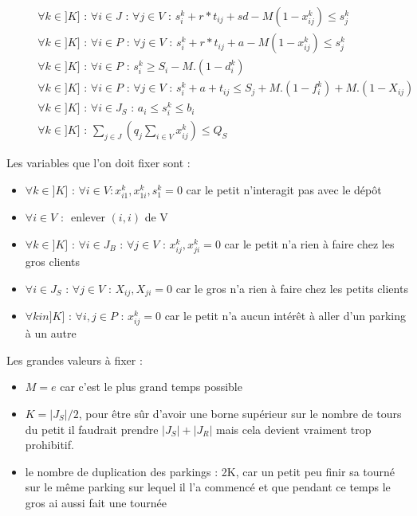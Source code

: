 \documentclass[12pt,a4paper,fleqn]{article}
\begin{document}
\begin{align}
& && \forall k \in ]K] \text{ : } \forall i \in J \text{ : } \forall j \in V \text{ : } s_i^k + r*t_{ij} + sd - M(1-x_{ij}^k) \leqslant s_j^k \label{sequentialitepetit1} \\
& && \forall k \in ]K] \text{ : } \forall i \in P \text{ : } \forall j \in V \text{ : } s_i^k + r*t_{ij} + a - M(1-x_{ij}^k) \leqslant s_j^k \label{sequentialitepetit2} \\
& && \forall k \in ]K] \text{ : } \forall i \in P \text{ : } s_i^k \geqslant S_i - M.(1 - d_i^k) \label{datedebutpetit} \\
& && \forall k \in ]K] \text{ : } \forall i \in P \text{ : } \forall j \in V \text{ : } s_i^k + a + t_{ij} \leqslant S_j + M.(1 - f^k_i) + M.(1 - X_{ij}) \label{datedefinpetit} \\
& && \forall k \in ]K] \text{ : } \forall i \in J_S \text{ : } a_i \leqslant s_i^k \leqslant b_i \label{fenetrepetit} \\
& && \forall k \in ]K] \text{ : } \sum \limits_{j \in J} (q_j \sum \limits_{i \in V} x^k_{ij}) \leqslant Q_S \label{capa}
\end{align}

\clearpage

Les variables que l'on doit fixer sont :
\begin{itemize}
\item $\forall k \in ]K] \text{ : } \forall i \in V : x^k_{i1}, x^k_{1i}, s^k_1 = 0$ car le petit n'interagit pas avec le dépôt
\item $\forall i \in V \text{ : }$ enlever $(i,i)$ de V
\item $\forall k \in ]K] \text{ : } \forall i \in J_B \text{ : } \forall j \in V \text{ : } x^k_{ij}, x^k_{ji} = 0$ car le petit n'a rien à faire chez les gros clients
\item $\forall i \in J_S \text{ : } \forall j \in V \text{ : } X_{ij}, X_{ji} = 0$ car le gros n'a rien à faire chez les petits clients
\item $\forall k in ]K] \text{ : } \forall i,j \in P \text{ : } x_{ij}^k = 0$ car le petit n'a aucun intérêt à aller d'un parking à un autre
\end{itemize}

Les grandes valeurs à fixer :
\begin{itemize}
\item $M = e$ car c'est le plus grand temps possible
\item $K = |J_S|/2$, pour être sûr d'avoir une borne supérieur sur le nombre de tours du petit il faudrait prendre $|J_S| + |J_R|$ mais cela devient vraiment trop prohibitif.
\item le nombre de duplication des parkings : 2K, car un petit peu finir sa tourné sur le même parking sur lequel il l'a commencé et que pendant ce temps le gros ai aussi fait une tournée
\end{itemize}
\end{document}
